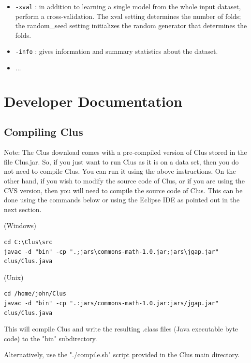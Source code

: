 \documentclass[a4paper]{report}
\begin{document}
\begin{itemize}
\item {\tt -xval} : in addition to learning a single model from the whole input dataset, perform a cross-validation.  The xval setting determines the number of folds; the random\_seed setting initializes the random generator that determines the folds.
\item {\tt -info} : gives information and summary statistics about the dataset.
\item ...
\end{itemize}

\chapter{Developer Documentation}

\section{Compiling Clus}

Note: The Clus download comes with a pre-compiled version of Clus 
stored in the file Clus.jar. So, if you just want to run Clus as it is on a 
data set, then you do not need to compile Clus. You can run it using the
above instructions. On the other hand, if you wish to modify the source 
code of Clus, or if you are using the CVS version, then you will need to 
compile the source code of Clus. This can be done using the commands
below or using the Eclipse IDE as pointed out in the next section.

(Windows)

\begin{small}
\begin{verbatim}
cd C:\Clus\src
javac -d "bin" -cp ".;jars\commons-math-1.0.jar;jars\jgap.jar" clus/Clus.java
\end{verbatim}
\end{small}

(Unix)

\begin{small}
\begin{verbatim}
cd /home/john/Clus
javac -d "bin" -cp ".:jars/commons-math-1.0.jar:jars/jgap.jar" clus/Clus.java
\end{verbatim}
\end{small}

This will compile Clus and write the resulting .class files (Java executable 
byte code) to the "bin" subdirectory.

Alternatively, use the "./compile.sh" script provided in the Clus main directory.
\end{document}
